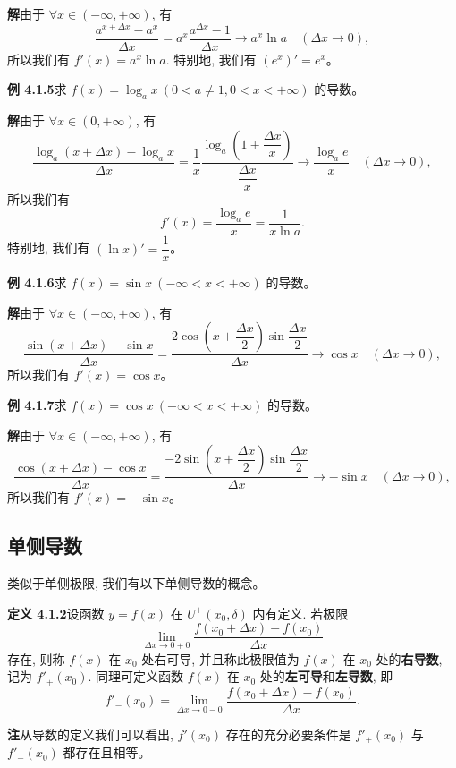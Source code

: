 \documentclass[UTF8,12pt,a4paper,fontset=fandol]{ctexart}
\begin{document}
\noindent\textbf{解}\quad 由于 $\forall x\in(-\infty,+\infty)$, 有
\[
  \frac{a^{x+\Delta x}-a^x}{\Delta x}
  =
  a^x\frac{a^{\Delta x}-1}{\Delta x}
  \to a^x\ln a\quad(\Delta x\to0),
\]
所以我们有 $f'(x)=a^x\ln a$. 特别地, 我们有 $(e^x)'=e^x$。

\noindent\textbf{例 4.1.5}\quad 求 $f(x)=\log_a x\ (0<a\ne1,0<x<+\infty)$ 的导数。

\noindent\textbf{解}\quad 由于 $\forall x\in(0,+\infty)$, 有
\[
  \frac{\log_a(x+\Delta x)-\log_a x}{\Delta x}
  =
  \frac1x
  \frac{\log_a\left(1+\dfrac{\Delta x}{x}\right)}
       {\dfrac{\Delta x}{x}}
  \to
  \frac{\log_a e}{x}\quad(\Delta x\to0),
\]
所以我们有
\[
  f'(x)=\frac{\log_a e}{x}=\frac1{x\ln a}.
\]
特别地, 我们有 $(\ln x)'=\dfrac1x$。

\noindent\textbf{例 4.1.6}\quad 求 $f(x)=\sin x\ (-\infty<x<+\infty)$ 的导数。

\noindent\textbf{解}\quad 由于 $\forall x\in(-\infty,+\infty)$, 有
\[
  \frac{\sin(x+\Delta x)-\sin x}{\Delta x}
  =
  \frac{2\cos\left(x+\dfrac{\Delta x}{2}\right)\sin\dfrac{\Delta x}{2}}
       {\Delta x}
  \to
  \cos x\quad(\Delta x\to0),
\]
所以我们有 $f'(x)=\cos x$。

\noindent\textbf{例 4.1.7}\quad 求 $f(x)=\cos x\ (-\infty<x<+\infty)$ 的导数。

\noindent\textbf{解}\quad 由于 $\forall x\in(-\infty,+\infty)$, 有
\[
  \frac{\cos(x+\Delta x)-\cos x}{\Delta x}
  =
  \frac{-2\sin\left(x+\dfrac{\Delta x}{2}\right)\sin\dfrac{\Delta x}{2}}
       {\Delta x}
  \to
  -\sin x\quad(\Delta x\to0),
\]
所以我们有 $f'(x)=-\sin x$。

\subsection{单侧导数}

类似于单侧极限, 我们有以下单侧导数的概念。

\noindent\textbf{定义 4.1.2}\quad 设函数 $y=f(x)$ 在 $U^+(x_0,\delta)$ 内有定义. 若极限
\[
  \lim_{\Delta x\to0+0}
  \frac{f(x_0+\Delta x)-f(x_0)}{\Delta x}
\]
存在, 则称 $f(x)$ 在 $x_0$ 处右可导, 并且称此极限值为 $f(x)$ 在 $x_0$ 处的\textbf{右导数}, 记为 $f'_+(x_0)$. 同理可定义函数 $f(x)$ 在 $x_0$ 处的\textbf{左可导}和\textbf{左导数}, 即
\[
  f'_-(x_0)=
  \lim_{\Delta x\to0-0}
  \frac{f(x_0+\Delta x)-f(x_0)}{\Delta x}.
\]

\noindent\textbf{注}\quad 从导数的定义我们可以看出, $f'(x_0)$ 存在的充分必要条件是 $f'_+(x_0)$ 与 $f'_-(x_0)$ 都存在且相等。
\end{document}
